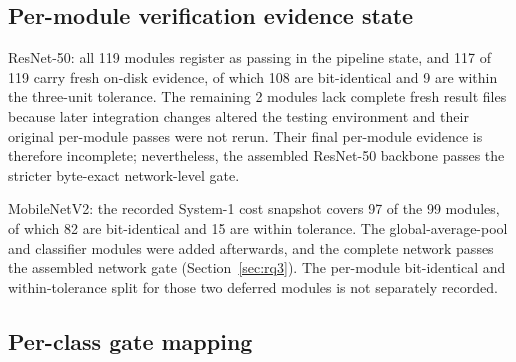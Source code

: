 \subsection{Per-module verification evidence state}

ResNet-50: all 119 modules register as passing in the pipeline state, and 117 of 119 carry fresh on-disk evidence, of which 108 are bit-identical and 9 are within the three-unit tolerance. The remaining 2 modules lack complete fresh result files because later integration changes altered the testing environment and their original per-module passes were not rerun. Their final per-module evidence is therefore incomplete; nevertheless, the assembled ResNet-50 backbone passes the stricter byte-exact network-level gate.

MobileNetV2: the recorded System-1 cost snapshot covers 97 of the 99 modules, of which 82 are bit-identical and 15 are within tolerance. The global-average-pool and classifier modules were added afterwards, and the complete network passes the assembled network gate (Section~\ref{sec:rq3}). The per-module bit-identical and within-tolerance split for those two deferred modules is not separately recorded.

\subsection{Per-class gate mapping}

